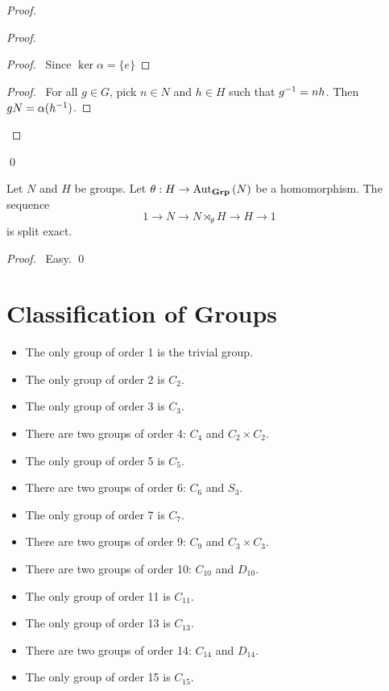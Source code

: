 \begin{proof}
\pf
{}
\begin{proof}
	\begin{proof}
		\pf\ Since $\ker \alpha = \{e\}$
	\end{proof}
	\begin{proof}
		\pf\ For all $g \in G$, pick $n \in N$ and $h \in H$ such that ${g}^{-1} = nh$. Then $gN = \alpha({h}^{-1})$.
	\end{proof}
\end{proof}
\qed
\end{proof}

\begin{prop}
Let $N$ and $H$ be groups. Let $\theta : H \rightarrow \mathrm{Aut}_{\mathbf{Grp}} \left( {N} \right)$ be a homomorphism. The sequence
\[ 1 \rightarrow N \rightarrow N \rtimes_\theta H \rightarrow H \rightarrow 1 \]
is split exact.
\end{prop}

\begin{proof}
\pf\ Easy. \qed
\end{proof}

\chapter{Classification of Groups}

\begin{ex}
\begin{itemize}
\item The only group of order 1 is the trivial group.
\item The only group of order 2 is $C_2$.
\item The only group of order 3 is $C_3$.
\item There are two groups of order 4: $C_4$ and $C_2 \times C_2$.
\item The only group of order 5 is $C_5$.
\item There are two groups of order 6: $C_6$ and $S_3$.
\item The only group of order 7 is $C_7$.
\item There are two groups of order 9: $C_9$ and $C_3 \times C_3$.
\item There are two groups of order 10: $C_{10}$ and $D_{10}$.
\item The only group of order 11 is $C_{11}$.
\item The only group of order 13 is $C_{13}$.
\item There are two groups of order 14: $C_{14}$ and $D_{14}$.
\item The only group of order 15 is $C_{15}$.
\end{itemize}
\end{ex}

